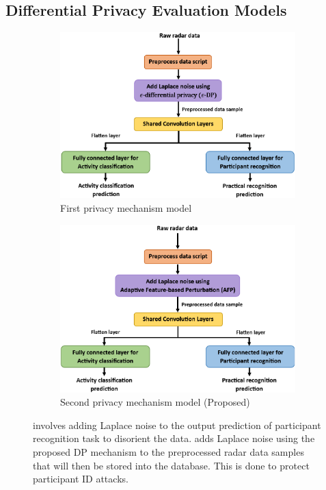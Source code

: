 \documentclass{l4proj}
\begin{document}
\begin{appendices}
\subsection{Differential Privacy Evaluation Models}
\begin{figure}[h]
   \centering
   \begin{subfigure}{0.49\textwidth}
        \includegraphics[width=\textwidth]{images/dp-model1.png}
        \caption{First privacy mechanism model}
        \label{fig:dp-model1}
    \end{subfigure}
    \hfill
    \begin{subfigure}{0.49\textwidth}
        \includegraphics[width=\textwidth]{images/dp-model2.png}
        \caption{Second privacy mechanism model (Proposed)}
        \label{fig:dp-model2}
    \end{subfigure}
  \caption{ involves adding Laplace noise to the output prediction of participant recognition task to disorient the data.  adds Laplace noise using the proposed DP mechanism to the preprocessed radar data samples that will then be stored into the database. This is done to protect participant ID attacks.}
  \label{fig:differential-privacy-mechanism-models}
\end{figure}


\end{appendices}
\end{document}
